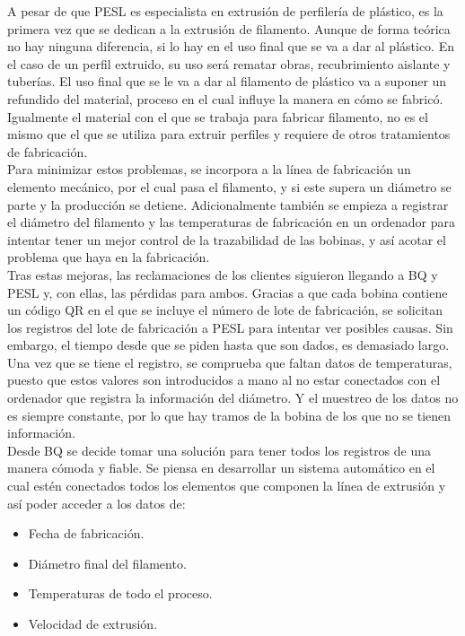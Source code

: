 A pesar de que PESL es especialista en extrusión de perfilería de plástico, es la primera vez que se dedican a la extrusión de filamento. Aunque de forma teórica no hay ninguna diferencia, si lo hay en el uso final que se va a dar al plástico. En el caso de un perfil extruido, su uso será rematar obras, recubrimiento aislante y tuberías. El uso final que se le va a dar al filamento de plástico va a suponer un refundido del material, proceso en el cual influye la manera en cómo se fabricó. Igualmente el material con el que se trabaja para fabricar filamento, no es el mismo que el que se utiliza para extruir perfiles y requiere de otros tratamientos de fabricación.\\ 

Para minimizar estos problemas, se incorpora a la línea de fabricación un elemento mecánico, por el cual pasa el filamento, y si este supera un diámetro se parte y la producción se detiene. Adicionalmente también se empieza a registrar el diámetro del filamento y las temperaturas de fabricación en un ordenador para intentar tener un mejor control de la trazabilidad de las bobinas, y así acotar el problema que haya en la fabricación.\\

Tras estas mejoras, las reclamaciones de los clientes siguieron llegando a BQ y PESL y, con ellas, las pérdidas para ambos. Gracias a que cada bobina contiene un código QR en el que se incluye el número de lote de fabricación, se solicitan los registros del lote de fabricación a PESL para intentar ver posibles causas. Sin embargo, el tiempo desde que se piden hasta que son dados, es demasiado largo. Una vez que se tiene el registro, se comprueba que faltan datos de temperaturas, puesto que estos valores son introducidos a mano al no estar conectados con el ordenador que registra la información del diámetro. Y el muestreo de los datos no es siempre constante, por lo que hay tramos de la bobina de los que no se tienen información.\\

Desde BQ se decide tomar una solución para tener todos los registros de una manera cómoda y fiable. Se piensa en desarrollar un sistema automático en el cual estén conectados todos los elementos que componen la línea de extrusión y así poder acceder a los datos de:

\begin{itemize}
    \item{Fecha de fabricación.}
    \item{Diámetro final del filamento.}
    \item{Temperaturas de todo el proceso.}
    \item{Velocidad de extrusión.}
\end{itemize}

